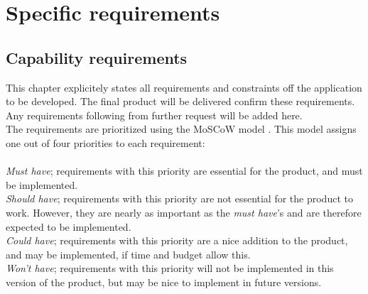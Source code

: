 \chapter{Specific requirements}
\section{Capability requirements}
This chapter explicitely states all requirements and constraints off the application to be developed. The final product will be delivered confirm these requirements. Any requirements following from further request will be added here. \\
The requirements are prioritized using the MoSCoW model \cite{moscow}. This model assigns one out of four priorities to each requirement: \\
\\
\emph{Must have}; requirements with this priority are essential for the product, and must be implemented. \\
\emph{Should have}; requirements with this priority are not essential for the product to work. However, they are nearly as important as the \emph{must have}'s and are therefore expected to be implemented. \\
\emph{Could have}; requirements with this priority are a nice addition to the product, and may be implemented, if time and budget allow this. \\
\emph{Won't have}; requirements with this priority will not be implemented in this version of the product, but may be nice to implement in future versions.\\

